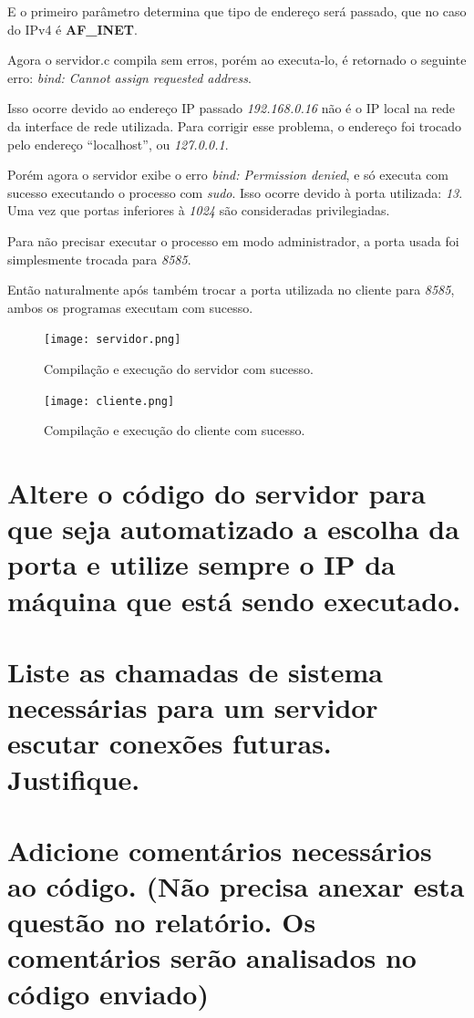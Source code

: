 \documentclass[12pt,a4paper]{report}
\begin{document}
E o primeiro parâmetro determina que tipo de endereço será passado, que no caso do IPv4 é \textbf{AF\_INET}.


\bigbreak

Agora o servidor.c compila sem erros, porém ao executa-lo, é retornado o seguinte erro: \emph{bind: Cannot assign requested address}.

Isso ocorre devido ao endereço IP passado \emph{192.168.0.16} não é o IP local na rede da interface de rede utilizada. Para corrigir esse problema, o endereço foi trocado pelo endereço ``localhost'', ou \emph{127.0.0.1}.

\bigbreak

Porém agora o servidor exibe o erro \emph{bind: Permission denied}, e só executa com sucesso executando o processo com \emph{sudo}. Isso ocorre devido à porta utilizada: \emph{13}. Uma vez que portas inferiores à \emph{1024} são consideradas privilegiadas.

Para não precisar executar o processo em modo administrador, a porta usada foi simplesmente trocada para \emph{8585}.

\bigbreak

Então naturalmente após também trocar a porta utilizada no cliente para \emph{8585}, ambos os programas executam com sucesso.

\begin{figure}[H]
  \texttt{[image: servidor.png]}
  \caption{Compilação e execução do servidor com sucesso.}
\end{figure}

\begin{figure}[H]
  \texttt{[image: cliente.png]}
  \caption{Compilação e execução do cliente com sucesso.}
\end{figure}

\section{Altere o código do servidor para que seja automatizado a escolha da porta e utilize sempre o
IP da máquina que está sendo executado.}


\section{Liste as chamadas de sistema necessárias para um servidor escutar conexões futuras.
Justifique.}

\section{Adicione comentários necessários ao código. (Não precisa anexar esta questão no relatório. Os
comentários serão analisados no código enviado)}
\end{document}
